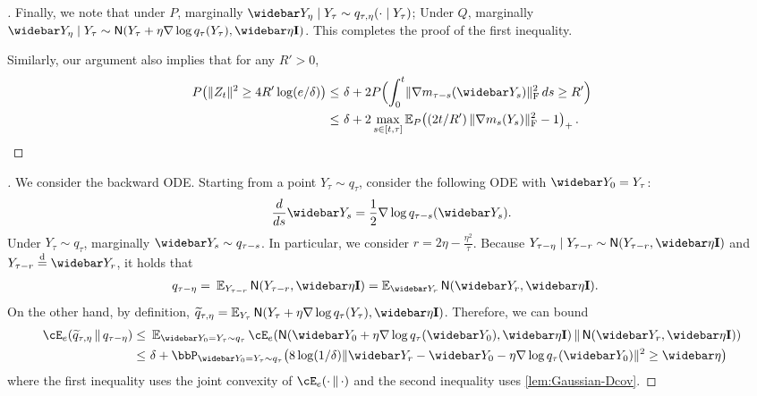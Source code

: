 \begin{proof}[]
Finally, we note that under $P$, marginally $\Ybar_{\eta}\mid Y_\tau\sim q_{\tau,\eta}(\cdot\mid Y_\tau)$; Under $Q$, marginally $\Ybar_\eta\mid Y_\tau\sim \normal{Y_\tau+\eta\nabla \log q_\tau(Y_\tau), \etabar\Id}$. This completes the proof of the first inequality.

Similarly, our argument also implies that for any $R'>0$,
\begin{align*}
    P\prn*{ \nrm{Z_t}^2 \geq 4R'\log(e/\delta) }
    \leq&~ \delta+2P\prn[\Big]{ \int_0^t \nrmF{\nabla m_{\tau-s}(\Ybar_s)}^2\,ds\geq R' } \\
    \leq&~ \delta+2\max_{s\in[t,\tau]} \En_P \prn*{(2t/R')\,\nrmF{\nabla m_{s}(Y_s)}^2-1}_+\,.
\end{align*}
\end{proof}


\begin{proof}[]
We consider the backward ODE.
Starting from a point $Y_\tau\sim q_\tau$, consider the following ODE with $\Ybar_0=Y_\tau$:
\begin{align}
    \frac{d}{ds} \Ybar_s=\frac12\nabla \log q_{\tau-s}(\Ybar_s).
\end{align}
Under $Y_\tau\sim q_\tau$, marginally $\Ybar_s\sim q_{\tau-s}$. In particular, we consider $r=2\eta-\frac{\eta^2}{\tau}$. Because $Y_{\tau-\eta}\mid Y_{\tau-r}\sim \normal{Y_{\tau-r}, \etabar\Id}$ and $Y_{\tau-r}\eqd \Ybar_{r}$, it holds that
\begin{align*}
    q_{\tau-\eta}=&~ \En_{Y_{\tau-r}} \normal{Y_{\tau-r}, \etabar\Id}
    = \En_{\Ybar_r} \normal{\Ybar_r, \etabar\Id}.
\end{align*}
On the other hand, by definition, $\wt{q}_{\tau,\eta}=\En_{Y_\tau}  \normal{Y_\tau+\eta \nabla \log q_\tau(Y_\tau), \etabar\Id}$. Therefore, we can bound
\begin{align*}
    \Dcov[e]{\wt{q}_{\tau,\eta}}{q_{\tau-\eta}}
    \leq&~ \En_{\Ybar_0=Y_\tau\sim q_\tau} \Dcov[e]{\normal{\Ybar_0+\eta \nabla \log q_\tau(\Ybar_0), \etabar\Id}}{\normal{\Ybar_r, \etabar\Id}} \\
    \leq&~ \delta+ \bbP_{\Ybar_0=Y_\tau\sim q_\tau}\prn*{ 8\log(1/\delta)\nrm{ \Ybar_r-\Ybar_0-\eta \nabla \log q_\tau(\Ybar_0) }^2\geq \etabar }
\end{align*}
where the first inequality uses the joint convexity of $\Dcov[e]{\cdot}{\cdot}$ and the second inequality uses \cref{lem:Gaussian-Dcov}.


\end{proof}
